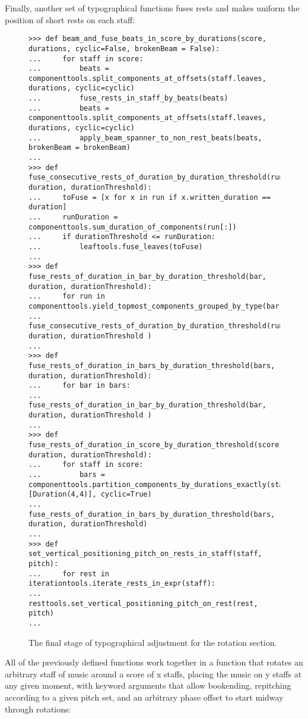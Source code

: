 Finally, another set of typographical functions fuses rests and makes uniform the position of short rests on each staff:

\begin{figure}[H]
\begin{lstlisting}[basicstyle=\scriptsize\ttfamily, breaklines=True, tabsize=4, showtabs=false, showspaces=false]
>>> def beam_and_fuse_beats_in_score_by_durations(score, durations, cyclic=False, brokenBeam = False):
...     for staff in score:
...         beats = componenttools.split_components_at_offsets(staff.leaves, durations, cyclic=cyclic)
...         fuse_rests_in_staff_by_beats(beats)
...         beats = componenttools.split_components_at_offsets(staff.leaves, durations, cyclic=cyclic)
...         apply_beam_spanner_to_non_rest_beats(beats, brokenBeam = brokenBeam)
... 
>>> def fuse_consecutive_rests_of_duration_by_duration_threshold(run, duration, durationThreshold):
...     toFuse = [x for x in run if x.written_duration == duration]
...     runDuration = componenttools.sum_duration_of_components(run[:])
...     if durationThreshold <= runDuration:
...         leaftools.fuse_leaves(toFuse)
... 
>>> def fuse_rests_of_duration_in_bar_by_duration_threshold(bar, duration, durationThreshold):
...     for run in componenttools.yield_topmost_components_grouped_by_type(bar):
...         fuse_consecutive_rests_of_duration_by_duration_threshold(run, duration, durationThreshold )
... 
>>> def fuse_rests_of_duration_in_bars_by_duration_threshold(bars, duration, durationThreshold):
...     for bar in bars:
...         fuse_rests_of_duration_in_bar_by_duration_threshold(bar, duration, durationThreshold )
... 
>>> def fuse_rests_of_duration_in_score_by_duration_threshold(score, duration, durationThreshold):
...     for staff in score:
...         bars = componenttools.partition_components_by_durations_exactly(staff.leaves, [Duration(4,4)], cyclic=True)
...         fuse_rests_of_duration_in_bars_by_duration_threshold(bars, duration, durationThreshold)
... 
>>> def set_vertical_positioning_pitch_on_rests_in_staff(staff, pitch):
...     for rest in iterationtools.iterate_rests_in_expr(staff):
...         resttools.set_vertical_positioning_pitch_on_rest(rest, pitch)
... \end{lstlisting}

\caption{The final stage of typographical adjustment for the rotation section. } 
\end{figure}
All of the previously defined functions work together in a function that rotates an arbitrary staff of music around a score of x staffs, placing the music on y staffs at any given moment, with keyword arguments that allow bookending, repitching according to a given pitch set, and an arbitrary phase offset to start midway through rotations:
